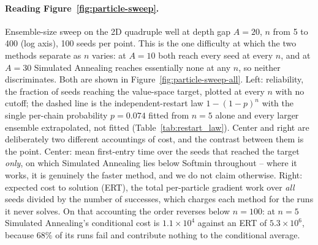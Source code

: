 \documentclass{article}
\theoremstyle{plain}
\theoremstyle{definition}
\theoremstyle{remark}
\begin{document}
\paragraph{Reading Figure~\ref{fig:particle-sweep}.} Ensemble-size sweep on the 2D quadruple well at depth gap $A=20$, $n$ from 5 to 400 (log axis), 100 seeds per point. This is the one difficulty at which the two methods separate as $n$ varies: at $A=10$ both reach every seed at every $n$, and at $A=30$ Simulated Annealing reaches essentially none at any $n$, so neither discriminates. Both are shown in Figure~\ref{fig:particle-sweep-all}. Left: reliability, the fraction of seeds reaching the value-space target, plotted at every $n$ with no cutoff; the dashed line is the independent-restart law $1-(1-p)^n$ with the single per-chain probability $p=0.074$ fitted from $n=5$ alone and every larger ensemble extrapolated, not fitted (Table~\ref{tab:restart_law}). Center and right are deliberately two different accountings of cost, and the contrast between them is the point. Center: mean first-entry time over the seeds that reached the target \emph{only}, on which Simulated Annealing lies below Softmin throughout -- where it works, it is genuinely the faster method, and we do not claim otherwise. Right: expected cost to solution (ERT), the total per-particle gradient work over \emph{all} seeds divided by the number of successes, which charges each method for the runs it never solves. On that accounting the order reverses below $n=100$: at $n=5$ Simulated Annealing's conditional cost is $1.1\times10^4$ against an ERT of $5.3\times10^6$, because $68\%$ of its runs fail and contribute nothing to the conditional average.
\end{document}
